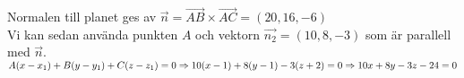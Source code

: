Normalen till planet ges av $\overrightarrow{n}=\overrightarrow{AB} \times 
\overrightarrow{AC} = (20,16,-6)$\\
Vi kan sedan använda punkten $A$ och vektorn $\overrightarrow{n_{2}}=
(10,8,-3)$ som är parallell med $\overrightarrow{n}$.\\
$A(x-x_{1})+B(y-y_{1})+C(z-z_{1})=0 \Rightarrow \\
10(x-1)+8(y-1)-3(z+2)=0 \Rightarrow \\
10x+8y-3z-24=0$